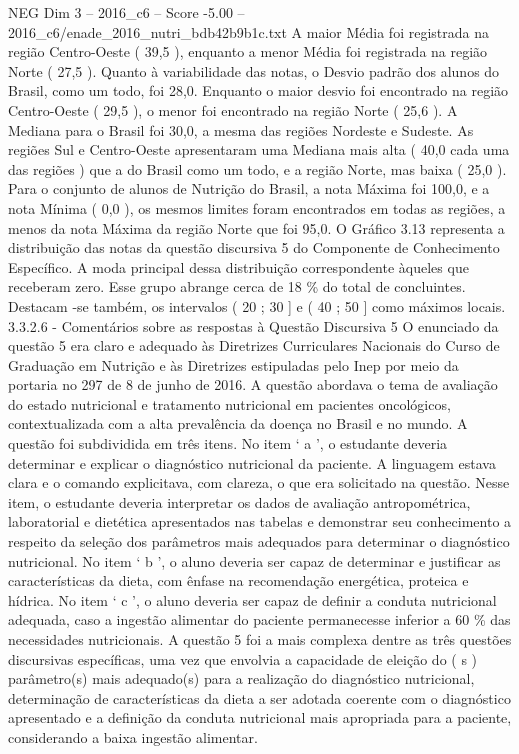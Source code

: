 \begin{textsample}{NEG Dim 3 – 2016\_c6 – Score -5.00 – 2016\_c6/enade\_2016\_nutri\_bdb42b9b1c.txt}
A maior Média foi registrada na região Centro-Oeste ( 39,5 ), enquanto a menor Média foi registrada na região Norte ( 27,5 ).
Quanto à variabilidade das notas, o Desvio padrão dos alunos do Brasil, como um todo, foi 28,0.
Enquanto o maior desvio foi encontrado na região Centro-Oeste ( 29,5 ), o menor foi encontrado na região Norte ( 25,6 ).
A Mediana para o Brasil foi 30,0, a mesma das regiões Nordeste e Sudeste.
As regiões Sul e Centro-Oeste apresentaram uma Mediana mais alta ( 40,0 cada uma das regiões ) que a do Brasil como um todo, e a região Norte, mas baixa ( 25,0 ).
Para o conjunto de alunos de Nutrição do Brasil, a nota Máxima foi 100,0, e a nota Mínima ( 0,0 ), os mesmos limites foram encontrados em todas as regiões, a menos da nota Máxima da região Norte que foi 95,0.
O Gráfico 3.13 representa a distribuição das notas da questão discursiva 5 do Componente de Conhecimento Específico.
A moda principal dessa distribuição correspondente àqueles que receberam zero.
Esse grupo abrange cerca de 18 \% do total de concluintes.
Destacam -se também, os intervalos ( 20 ; 30 ] e ( 40 ; 50 ] como máximos locais. 3.3.2.6 - Comentários sobre as respostas à Questão Discursiva 5 O enunciado da questão 5 era claro e adequado às Diretrizes Curriculares Nacionais do Curso de Graduação em Nutrição e às Diretrizes estipuladas pelo Inep por meio da portaria no 297 de 8 de junho de 2016.
A questão abordava o tema de avaliação do estado nutricional e tratamento nutricional em pacientes oncológicos, contextualizada com a alta prevalência da doença no Brasil e no mundo.
A questão foi subdividida em três itens.
No item ‘ a ’, o estudante deveria determinar e explicar o diagnóstico nutricional da paciente.
A linguagem estava clara e o comando explicitava, com clareza, o que era solicitado na questão.
Nesse item, o estudante deveria interpretar os dados de avaliação antropométrica, laboratorial e dietética apresentados nas tabelas e demonstrar seu conhecimento a respeito da seleção dos parâmetros mais adequados para determinar o diagnóstico nutricional.
No item ‘ b ’, o aluno deveria ser capaz de determinar e justificar as características da dieta, com ênfase na recomendação energética, proteica e hídrica.
No item ‘ c ’, o aluno deveria ser capaz de definir a conduta nutricional adequada, caso a ingestão alimentar do paciente permanecesse inferior a 60 \% das necessidades nutricionais.
A questão 5 foi a mais complexa dentre as três questões discursivas específicas, uma vez que envolvia a capacidade de eleição do ( s ) parâmetro(s) mais adequado(s) para a realização do diagnóstico nutricional, determinação de características da dieta a ser adotada coerente com o diagnóstico apresentado e a definição da conduta nutricional mais apropriada para a paciente, considerando a baixa ingestão alimentar.

\end{textsample}
